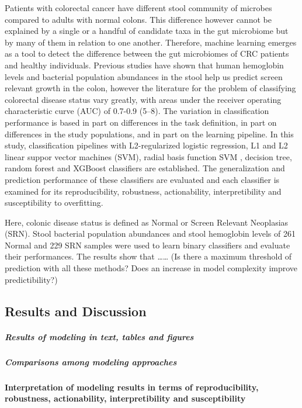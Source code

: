 \documentclass[11pt,]{article}
\let\oldparagraph\paragraph
\renewcommand{\paragraph}[1]{\oldparagraph{#1}\mbox{}}
\let\oldsubparagraph\subparagraph
\renewcommand{\subparagraph}[1]{\oldsubparagraph{#1}\mbox{}}
\begin{document}
Patients with colorectal cancer have different stool community of
microbes compared to adults with normal colons. This difference however
cannot be explained by a single or a handful of candidate taxa in the
gut microbiome but by many of them in relation to one another.
Therefore, machine learning emerges as a tool to detect the difference
between the gut microbiomes of CRC patients and healthy individuals.
Previous studies have shown that human hemoglobin levels and bacterial
population abundances in the stool help us predict screen relevant
growth in the colon, however the literature for the problem of
classifying colorectal disease status vary greatly, with areas under the
receiver operating characteristic curve (AUC) of 0.7-0.9 (5--8). The
variation in classification performance is based in part on differences
in the task definition, in part on differences in the study populations,
and in part on the learning pipeline. In this study, classification
pipelines with L2-regularized logistic regression, L1 and L2 linear
suppor vector machines (SVM), radial basis function SVM , decision tree,
random forest and XGBoost classifiers are established. The
generalization and prediction performance of these classifiers are
evaluated and each classifier is examined for its reproducibility,
robustness, actionability, interpretibility and susceptibility to
overfitting.

Here, colonic disease status is defined as Normal or Screen Relevant
Neoplasias (SRN). Stool bacterial population abundances and stool
hemoglobin levels of 261 Normal and 229 SRN samples were used to learn
binary classifiers and evaluate their performances. The results show
that \ldots{}\ldots{} (Is there a maximum threshold of prediction with
all these methods? Does an increase in model complexity improve
predictibility?)

\subsection{Results and Discussion}\label{results-and-discussion}

\subparagraph{Results of modeling in text, tables and
figures}\label{results-of-modeling-in-text-tables-and-figures}

\subparagraph{Comparisons among modeling
approaches}\label{comparisons-among-modeling-approaches}

\paragraph{Interpretation of modeling results in terms of
reproducibility, robustness, actionability, interpretibility and
susceptibility}\label{interpretation-of-modeling-results-in-terms-of-reproducibility-robustness-actionability-interpretibility-and-susceptibility}
\end{document}
